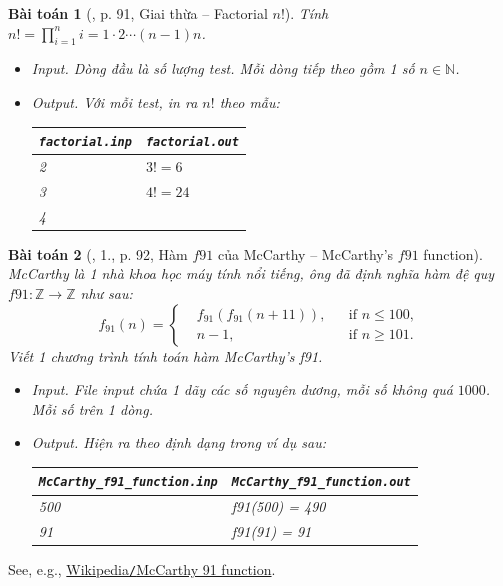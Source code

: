 \documentclass{article}
\newtheorem{baitoan}{Bài toán}
\begin{document}
\begin{baitoan}[\cite{VietSTEM2021}, p. 91, Giai thừa -- Factorial $n!$]
	Tính $n! = \prod_{i=1}^n i = 1\cdot2\cdots(n - 1)n$.
	\begin{itemize}
		\item {\sf Input.} Dòng đầu là số lượng test. Mỗi dòng tiếp theo gồm 1 số $n\in\mathbb{N}$.
		\item {\sf Output.} Với mỗi test, in ra $n!$ theo mẫu:
		\begin{table}[H]
			\centering
			\begin{tabular}{|l|l|}
				\hline
				\texttt{factorial.inp} & \texttt{factorial.out} \\
				\hline
				2 & $3! = 6$ \\
				3 & $4! = 24$ \\
				4 &  \\
				\hline
			\end{tabular}
		\end{table}
	\end{itemize}
\end{baitoan}

\begin{baitoan}[\cite{VietSTEM2021}, 1., p. 92, Hàm $f91$ của McCarthy -- McCarthy's $f91$ function]
	McCarthy là 1 nhà khoa học máy tính nổi tiếng, ông đã định nghĩa hàm đệ quy $f91:\mathbb{Z}\to\mathbb{Z}$ như sau:
	\begin{equation*}
		f_{91}(n) = \left\{\begin{split}
			&f_{91}(f_{91}(n + 11)),&&\mbox{if } n\le100,\\
			&n -1,&&\mbox{if } n\ge101.
		\end{split}\right.
	\end{equation*}
	Viết 1 chương trình tính toán hàm McCarthy's f91.
	\begin{itemize}
		\item {\sf Input.} File input chứa 1 dãy các số nguyên dương, mỗi số không quá $1000$. Mỗi số trên 1 dòng.
		\item {\sf Output.} Hiện ra theo định dạng trong ví dụ sau:
		\begin{table}[H]
			\centering
			\begin{tabular}{|l|l|}
				\hline
				\verb|McCarthy_f91_function.inp| & \verb|McCarthy_f91_function.out| \\
				\hline
				500 & f91(500) = 490 \\
				91 & f91(91) = 91 \\
				\hline
			\end{tabular}
		\end{table}
	\end{itemize}
\end{baitoan}
See, e.g., \href{https://en.wikipedia.org/wiki/McCarthy_91_function}{Wikipedia\texttt{/}McCarthy 91 function}.
\end{document}
